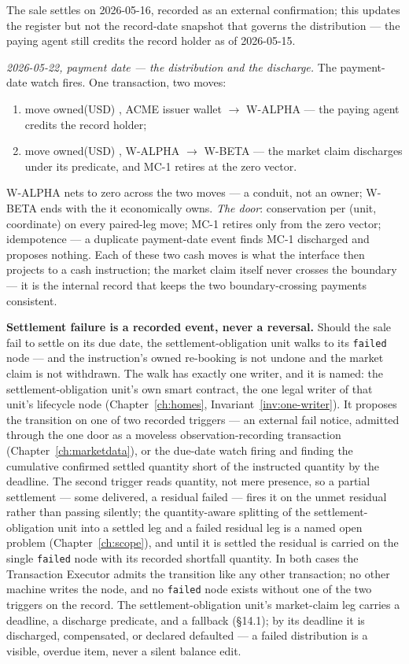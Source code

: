 The sale settles on 2026-05-16, recorded as an external confirmation; this updates
the register but not the record-date snapshot that governs the distribution --- the
paying agent still credits the record holder as of 2026-05-15.

\emph{2026-05-22, payment date --- the distribution and the discharge.} The
payment-date watch fires. One transaction, two moves:
\begin{enumerate}[label=(\arabic*),nosep]
\item move owned(USD) , ACME issuer wallet $\to$ W-ALPHA --- the paying
agent credits the record holder;
\item move owned(USD) , W-ALPHA $\to$ W-BETA --- the market claim
discharges under its predicate, and MC-1 retires at the zero vector.
\end{enumerate}
W-ALPHA nets to zero across the two moves --- a conduit, not an owner; W-BETA ends
with the  it economically owns. \emph{The door}: conservation per
(unit, coordinate) on every paired-leg move; MC-1 retires only from the zero vector;
idempotence --- a duplicate payment-date event finds MC-1 discharged and proposes
nothing. Each of these two cash moves is what the interface then projects to a cash
instruction; the market claim itself never crosses the boundary --- it is the
internal record that keeps the two boundary-crossing payments consistent.

\medskip\noindent\textbf{Settlement failure is a recorded event, never a reversal.}
Should the sale fail to settle on its due date, the settlement-obligation unit walks
to its \texttt{failed} node --- and the instruction's owned re-booking is not undone
and the market claim is not withdrawn. The walk has exactly one writer, and it is
named: the settlement-obligation unit's own smart contract, the one legal writer of
that unit's lifecycle node (Chapter~\ref{ch:homes}, Invariant~\ref{inv:one-writer}).
It proposes the transition on one of two recorded triggers --- an external fail
notice, admitted through the one door as a moveless observation-recording transaction
(Chapter~\ref{ch:marketdata}), or the due-date watch firing and finding the cumulative
confirmed settled quantity short of the instructed quantity by the deadline. The
second trigger reads quantity, not mere presence, so a partial settlement --- some
delivered, a residual failed --- fires it on the unmet residual rather than passing
silently; the quantity-aware splitting of the settlement-obligation unit into a
settled leg and a failed residual leg is a named open problem (Chapter~\ref{ch:scope}),
and until it is settled the residual is carried on the single \texttt{failed} node with
its recorded shortfall quantity. In both cases the Transaction Executor admits the
transition like any other transaction; no other machine writes the node, and no
\texttt{failed} node exists without one of the two triggers on the record. The settlement-obligation unit's market-claim leg carries
a deadline, a discharge predicate, and a fallback (\S14.1); by its deadline it is
discharged, compensated, or declared defaulted --- a failed distribution is a
visible, overdue item, never a silent balance edit.

